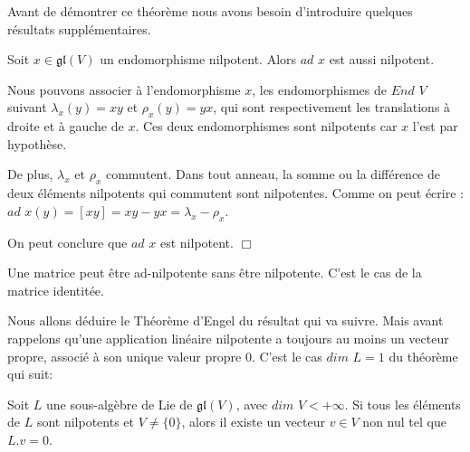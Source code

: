\documentclass[a4paper,openany,12pt]{report}
\newcommand{\gl}{\mathfrak{gl}}
\theoremstyle{break}
{\theorembodyfont{\upshape}
\newtheorem*{rmq}{Remarque :}
\newtheorem*{prv}{Preuve :}
\newtheorem*{ex}{Exemples :}
\newtheorem*{exe}{Exemple : }
\newtheorem*{nota}{Notation :}
\newtheorem*{dem}{D\'emonstration :}}
\begin{document}
\quad Avant de démontrer ce théorème nous avons besoin d’introduire quelques résultats supplémentaires.

\begin{lem}\label{lem:E1}
\quad Soit $x \in \gl(V)$ un endomorphisme nilpotent. Alors $ad$ $x$ est aussi nilpotent. 
\end{lem}

\begin{prv}
\quad Nous pouvons associer à l'endomorphisme $x$, les endomorphismes de $End$ $V$ suivant $\lambda_{x}(y)=xy$ et $\rho_{x}(y)=yx$, qui sont respectivement les translations à droite et à gauche de $x$. Ces deux endomorphismes sont nilpotents car $x$ l'est par hypothèse.

De plus, $\lambda_{x}$ et $\rho_{x}$ commutent. Dans tout anneau, la somme ou la différence de deux éléments nilpotents qui commutent sont nilpotentes. Comme on peut écrire :
$ad$ $x(y)= [xy] = xy-yx = \lambda_{x} - \rho_{x}$.

On peut conclure que $ad$ $x$ est nilpotent. $\Box$
\end{prv}

\begin{rmq}
\quad Une matrice peut être ad-nilpotente sans être nilpotente. C'est le cas de la matrice identitée. 
\end{rmq}

Nous allons déduire le Théorème d'Engel du résultat qui va suivre. Mais avant rappelons qu'une application linéaire nilpotente a toujours au moins un vecteur propre, associé à son unique valeur propre $0$. C'est le cas $dim$  $L = 1$ du théorème qui suit:

\begin{thm}\label{thm:E1}
\quad Soit $L$ une sous-algèbre de Lie de $\gl (V)$, avec $dim$ $V < + \infty$. Si tous les éléments de $L$ sont nilpotents et $V  \neq  \{0\}$, alors il existe un vecteur $v \in V$ non nul tel que $L.v = 0$.
\end{thm}
\end{document}
